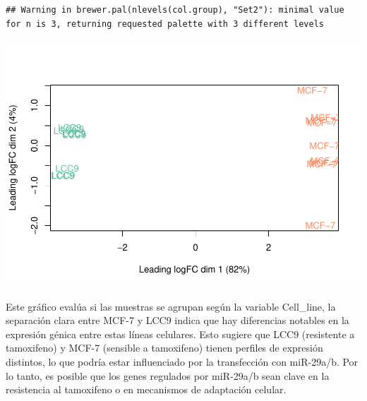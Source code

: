 \documentclass[
]{article}
\newenvironment{Shaded}{\begin{snugshade}}{\end{snugshade}}
\newcommand{\AttributeTok}[1]{\textcolor[rgb]{0.13,0.29,0.53}{#1}}
\newcommand{\DocumentationTok}[1]{\textcolor[rgb]{0.56,0.35,0.01}{\textbf{\textit{#1}}}}
\newcommand{\FunctionTok}[1]{\textcolor[rgb]{0.13,0.29,0.53}{\textbf{#1}}}
\newcommand{\NormalTok}[1]{#1}
\newcommand{\OtherTok}[1]{\textcolor[rgb]{0.56,0.35,0.01}{#1}}
\newcommand{\SpecialCharTok}[1]{\textcolor[rgb]{0.81,0.36,0.00}{\textbf{#1}}}
\begin{document}
\begin{verbatim}
## Warning in brewer.pal(nlevels(col.group), "Set2"): minimal value for n is 3, returning requested palette with 3 different levels
\end{verbatim}

\begin{Shaded}
\end{Shaded}

\includegraphics{Proyecto_RNAseq_files/figure-latex/unnamed-chunk-18-1.pdf}

Este gráfico evalúa si las muestras se agrupan según la variable
Cell\_line, la separación clara entre MCF-7 y LCC9 indica que hay
diferencias notables en la expresión génica entre estas líneas
celulares. Esto sugiere que LCC9 (resistente a tamoxifeno) y MCF-7
(sensible a tamoxifeno) tienen perfiles de expresión distintos, lo que
podría estar influenciado por la transfección con miR-29a/b. Por lo
tanto, es posible que los genes regulados por miR-29a/b sean clave en la
resistencia al tamoxifeno o en mecanismos de adaptación celular.
\end{document}
